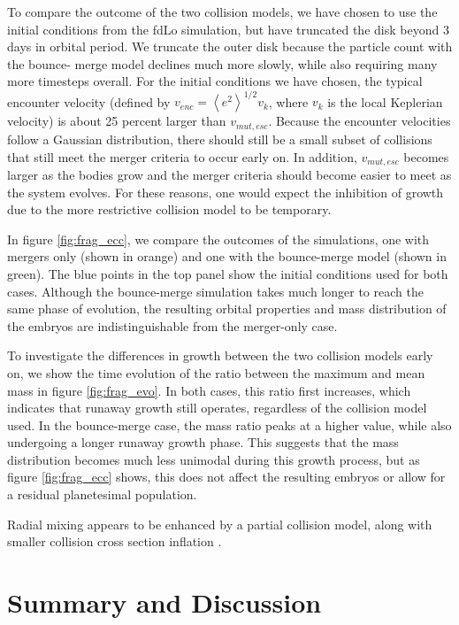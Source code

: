 \documentclass[twocolumn]{aastex63}
\begin{document}
To compare the outcome of the two collision models, we have chosen to use the initial conditions from the fdLo simulation, but 
have truncated the disk beyond 3 days in orbital period. We truncate the outer disk because the particle count with the bounce-
merge model declines much more slowly, while also requiring many more timesteps overall.
For the initial conditions we have chosen, the typical encounter velocity (defined by $v_{enc} = \left< e^{2} \right>^{1/2} v_{k}$, 
where $v_{k}$ is the local Keplerian velocity) is about 25 percent larger than $v_{mut, esc}$. Because the encounter velocities 
follow a Gaussian distribution, there should still be a small subset of collisions that still meet the merger criteria to occur early on. 
In addition, $v_{mut, esc}$ becomes larger as the bodies grow and the merger criteria should become easier to meet as the 
system evolves. For these reasons, one would expect the inhibition of growth due to the more restrictive collision model to be temporary.

In figure \ref{fig:frag_ecc}, we compare the outcomes of the simulations, one with mergers only (shown in orange) and one with the bounce-merge model (shown in green). The blue points in the top panel show the initial conditions used for both cases. Although the bounce-merge simulation takes much longer to reach the same phase of evolution, the resulting orbital properties and mass distribution of the embryos are indistinguishable from the merger-only case.

To investigate the differences in growth between the two collision models early on, we show the time evolution of the ratio between the maximum and mean mass in figure \ref{fig:frag_evo}. In both cases, this ratio first increases, which indicates that runaway growth still operates, regardless of the collision model used. In the bounce-merge case, the mass ratio peaks at a higher value, while also undergoing a longer runaway growth phase. This suggests that the mass distribution becomes much less unimodal during this growth process, but as figure \ref{fig:frag_ecc} shows, this does not affect the resulting embryos or allow for a residual planetesimal population.

Radial mixing appears to be enhanced by a partial collision model, along with smaller collision cross section inflation \citep{childs22}.

\section{Summary and Discussion} \label{sec:discuss}
\end{document}

